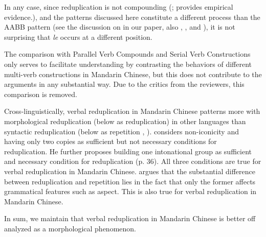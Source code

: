 \documentclass[fleqn,twoside]{article}
\begin{document}
\begin{enumerate}
In any case, since reduplication is not compounding (\citealt[149--150]{Sui2018}; \citealt{GaoEtAl2021} provides empirical evidence.),
and the patterns discussed here constitute a different process than the AABB pattern
(see the discussion on \citealt{Xie2020} in our paper, also \citealt[Sec. 4.3]{Deng2013}, \citealt[Sec. 2]{SuiHu2016}, \citealt{Sui2018} and \citealt{Wang2023}),
it is not surprising that \textit{le} occurs at a different position.

The comparison with Parallel Verb Compounds and Serial Verb Constructions only serves to facilitate understanding
by contrasting the behaviors of different multi-verb constructions in Mandarin Chinese,
but this does not contribute to the arguments in any substantial way.
Due to the critics from the reviewers, this comparison is removed.

Cross-linguistically, verbal reduplication in Mandarin Chinese patterns more with morphological reduplication (below as reduplication) in other languages
than syntactic reduplication (below as repetition \citealt[31]{Gil2005}, \citealt[1--2]{Forza2016}).
\citet[35--36]{Gil2005} considers non-iconicity and having only two copies as sufficient but not necessary conditions for reduplication.
He further proposes building one intonational group as sufficient and necessary condition for reduplication (p. 36).
All three conditions are true for verbal reduplication in Mandarin Chinese.
\citet[9]{Forza2016} argues that the substantial difference between reduplication and repetition lies in the fact that only the former affects grammatical features such as aspect.
This is also true for verbal reduplication in Mandarin Chinese.

In sum, we maintain that verbal reduplication in Mandarin Chinese is better off analyzed as a morphological phenomenon.


\end{enumerate}
\end{document}
